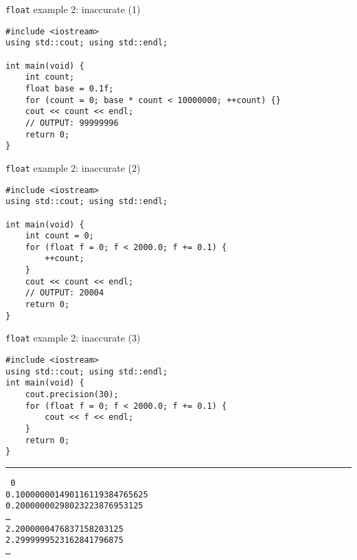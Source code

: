 \begin{frame}[fragile,label=floatEx2In1]{\texttt{float} example 2: inaccurate (1)}
\lstset{
    language=C++,
    style=smaller
}
\begin{lstlisting}
#include <iostream>
using std::cout; using std::endl;

int main(void) {
    int count;
    float base = 0.1f;
    for (count = 0; base * count < 10000000; ++count) {}
    cout << count << endl;
    // OUTPUT: 99999996
    return 0;
}
\end{lstlisting}
\end{frame}

\begin{frame}[fragile,label=floatEx2In2]{\texttt{float} example 2: inaccurate (2)}
\lstset{
    language=C++,
    style=smaller
}
\begin{lstlisting}
#include <iostream>
using std::cout; using std::endl;

int main(void) {
    int count = 0;
    for (float f = 0; f < 2000.0; f += 0.1) {
        ++count;
    }
    cout << count << endl;
    // OUTPUT: 20004
    return 0;
}
\end{lstlisting}
\end{frame}

\begin{frame}[fragile,label=floatEx2In3]{\texttt{float} example 2: inaccurate (3)}
\lstset{
    language=C++,
    style=smaller
}
\begin{lstlisting}
#include <iostream>
using std::cout; using std::endl;
int main(void) {
    cout.precision(30);
    for (float f = 0; f < 2000.0; f += 0.1) {
        cout << f << endl;
    }
    return 0;
}
\end{lstlisting}
\hrule
\small\tt
0 \\
0.100000001490116119384765625 \\
0.20000000298023223876953125 \\
\ldots \\
2.2000000476837158203125 \\
2.2999999523162841796875 \\
\ldots
\end{frame}

